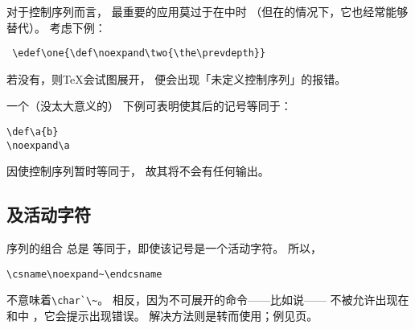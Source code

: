 \documentclass{book}
\begin{document}
对于控制序列而言，
最重要的应用莫过于在中时
（但在的情况下，它也经常能够替代）。
考虑下例：
\begin{verbatim}
 \edef\one{\def\noexpand\two{\the\prevdepth}}
\end{verbatim}
若没有，则{\TeX}会试图展开，
便会出现「未定义控制序列」的报错。

一个（没太大意义的）
下例可表明使其后的记号等同于：
\begin{verbatim}
\def\a{b}
\noexpand\a
\end{verbatim}
因使控制序列暂时等同于，
故其将不会有任何输出。

\subsection{\protect{}及活动字符}

序列的组合
总是
等同于，即使该记号是一个活动字符。
所以，
\begin{verbatim}
\csname\noexpand~\endcsname
\end{verbatim}
不意味着\verb>\char`\~>。
相反，因为不可展开的命令——比如说——
不被允许出现在和中
，它会提示出现错误。
解决方法则是转而使用；例见\pageref{store:cat}页。
\end{document}
